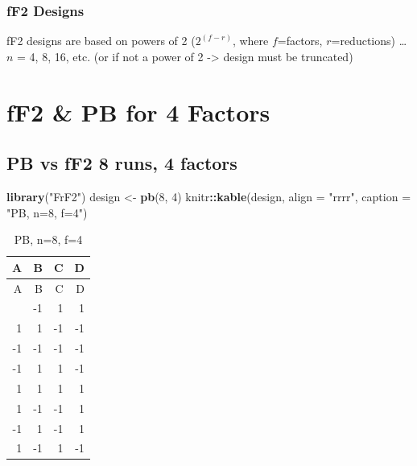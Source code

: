 \documentclass[
  12pt,
  a4paper,
]{article}
\newenvironment{Shaded}{\begin{snugshade}}{\end{snugshade}}
\newcommand{\AttributeTok}[1]{\textcolor[rgb]{0.13,0.29,0.53}{#1}}
\newcommand{\DecValTok}[1]{\textcolor[rgb]{0.00,0.00,0.81}{#1}}
\newcommand{\FunctionTok}[1]{\textcolor[rgb]{0.13,0.29,0.53}{\textbf{#1}}}
\newcommand{\NormalTok}[1]{#1}
\newcommand{\OtherTok}[1]{\textcolor[rgb]{0.56,0.35,0.01}{#1}}
\newcommand{\SpecialCharTok}[1]{\textcolor[rgb]{0.81,0.36,0.00}{\textbf{#1}}}
\newcommand{\StringTok}[1]{\textcolor[rgb]{0.31,0.60,0.02}{#1}}
\numberwithin{equation}{section}
\theoremstyle{plain}
\theoremstyle{definition}
\theoremstyle{remark}
\theoremstyle{note}
\begin{document}
\hypertarget{ff2-designs}{%
\subsubsection{fF2 Designs}\label{ff2-designs}}

fF2 designs are based on powers of 2 (\(2^{(f-r)}\), where
\(f\)=factors, \(r\)=reductions) \ldots{} \(n\) = 4, 8, 16, etc. (or if
not a power of 2 -\textgreater{} design must be truncated)

\newpage

\hypertarget{ff2-pb-for-4-factors}{%
\section{fF2 \& PB for 4 Factors}\label{ff2-pb-for-4-factors}}

\setcounter{table}{0}

\hypertarget{pb-vs-ff2-8-runs-4-factors}{%
\subsection{PB vs fF2 8 runs, 4
factors}\label{pb-vs-ff2-8-runs-4-factors}}

\begin{Shaded}
\begin{Highlighting}[]
\FunctionTok{library}\NormalTok{(}\StringTok{"FrF2"}\NormalTok{)}
\NormalTok{design }\OtherTok{\textless{}{-}} \FunctionTok{pb}\NormalTok{(}\DecValTok{8}\NormalTok{, }\DecValTok{4}\NormalTok{)}
\NormalTok{knitr}\SpecialCharTok{::}\FunctionTok{kable}\NormalTok{(design, }\AttributeTok{align =} \StringTok{"rrrr"}\NormalTok{, }\AttributeTok{caption =} \StringTok{"PB, n=8, f=4"}\NormalTok{)}
\end{Highlighting}
\end{Shaded}

\begin{longtable}[]{@{}rrrr@{}}
\caption{PB, n=8, f=4}\tabularnewline
\toprule\noalign{}
A & B & C & D \\
\midrule\noalign{}
\endfirsthead
\toprule\noalign{}
A & B & C & D \\
\midrule\noalign{}
\endhead
\bottomrule\noalign{}
\endlastfoot
-1 & -1 & 1 & 1 \\
1 & 1 & -1 & -1 \\
-1 & -1 & -1 & -1 \\
-1 & 1 & 1 & -1 \\
1 & 1 & 1 & 1 \\
1 & -1 & -1 & 1 \\
-1 & 1 & -1 & 1 \\
1 & -1 & 1 & -1 \\
\end{longtable}
\end{document}
